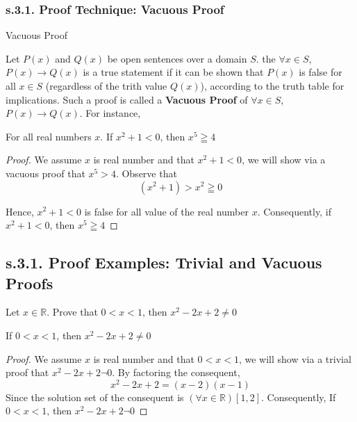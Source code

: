 \newpage
\subsubsection*{s.3.1. Proof Technique: Vacuous Proof}
\begin{definition}
Vacuous Proof

Let $P(x)$ and $Q(x)$ be open sentences over a domain $S$. the $\forall x \in S$, $P(x) \to Q(x)$ is a true statement if it can be shown that $P(x)$ is false for all $x \in S$ (regardless of the trith value $Q(x)$), according to the truth table for implications. Such a proof is called a {\bf Vacuous Proof} of $\forall x \in S$, $P(x) \to Q(x)$. For instance, 

\begin{tcolorbox}
	\begin{theorem}
		For all real numbers $x$. If $x^2 + 1 < 0$, then $x^5 \geqq 4$
	\end{theorem}
\end{tcolorbox}

\begin{proof}
We assume $x$ is real number and that $x^2 + 1 < 0$, we will show via a vacuous proof that $x^5 > 4$. Observe that 
	\begin{equation}
		(x^2 + 1) > x^2 \geqq 0 \nonumber 
	\end{equation}

Hence, $x^2 + 1 < 0$ is false for all value of the real number $x$. Consequently, if $x^2 + 1 < 0$, then $x^5 \geqq 4$
\end{proof}

\end{definition}



\newpage
\subsection{s.3.1. Proof Examples: Trivial and Vacuous Proofs}

\begin{example}
Let $x \in \mathbb{R}$. Prove that $0<x<1$, then $x^2-2x + 2 \neq 0$

\begin{tcolorbox}
	\begin{theorem}
		If $0<x<1$, then $x^2-2x + 2 \neq 0$
	\end{theorem}
\end{tcolorbox}

\begin{proof}
We assume $x$ is real number and that $0<x<1$, we will show via a trivial proof that $x^2 -2x + 2 \neg 0$. By factoring the consequent, 
	\begin{equation}
		x^2 - 2x + 2 = (x-2)(x-1)  \nonumber 
	\end{equation}
Since the solution set of the consequent is $(\forall x \in \mathbb{R})[ 1, 2]$. Consequently, If $0<x<1$, then $x^2-2x + 2 \neg 0$

\end{proof}
\end{example}


